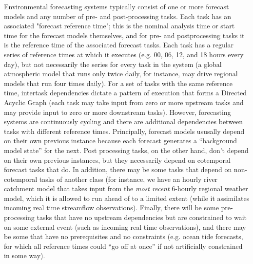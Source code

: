 \documentclass[11pt,a4paper]{article}
\begin{document}
Environmental forecasting systems typically consist of one or more
forecast models and any number of pre- and post-processing tasks. Each
task has an associated "forecast reference time"; this is the nominal
analysis time or start time for the forecast models themselves, and for
pre- and postprocessing tasks it is the reference time of the associated
forecast tasks. Each task has a regular series of reference times at
which it executes (e.g. 00, 06, 12, and 18 hours every day), but not
necessarily the series for every task in the system (a global
atmospheric model that runs only twice daily, for instance, may drive
regional models that run four times daily). For a set of tasks with the
same reference time, intertask dependencies dictate a pattern of
execution that forms a Directed Acyclic Graph (each task may take input
from zero or more upstream tasks and may provide input to zero or more
downstream tasks). However, forecasting systems are continuously cycling
and there are additional dependencies between tasks with different
reference times.  Principally, forecast models ususally depend on their
own previous instance because each forecast generates a ``background
model state'' for the next. Post processing tasks, on the other hand,
don't depend on their own previous instances, but they necessarily
depend on cotemporal forecast tasks that do. In addition, there may be
some tasks that depend on non-cotemporal tasks of another class (for
instance, we have an hourly river catchment model that takes input from
the {\em most recent} 6-hourly regional weather model, which it is
allowed to run ahead of to a limited extent (while it assimilates
incoming real time streamflow observations). Finally, there will be some
pre-processing tasks that have no upstream dependencies but are
constrained to wait on some external event (such as incoming real time
observations), and there may be some that have no prerequisites and no
constraints (e.g. ocean tide forecasts, for which all reference times
could ``go off at once'' if not artificially constrained in some way).  
\end{document}
